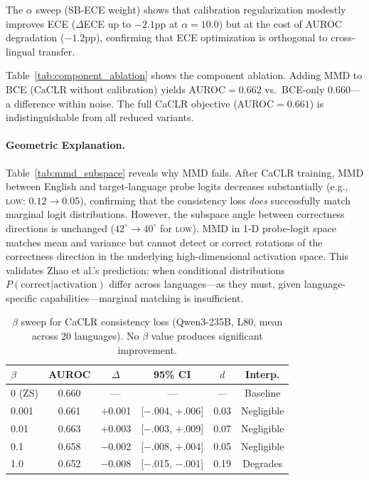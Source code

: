 \documentclass[11pt,a4paper]{article}
\newcommand{\auroc}{AUROC}
\begin{document}
The $\alpha$ sweep (SB-ECE weight) shows that calibration regularization modestly improves ECE ($\Delta$ECE up to $-2.1$pp at $\alpha=10.0$) but at the cost of \auroc{} degradation ($-1.2$pp), confirming that ECE optimization is orthogonal to cross-lingual transfer.

Table~\ref{tab:component_ablation} shows the component ablation. Adding MMD to BCE (CaCLR without calibration) yields \auroc{}$=0.662$ vs.\ BCE-only $0.660$---a difference within noise. The full CaCLR objective (\auroc{}$=0.661$) is indistinguishable from all reduced variants.

\paragraph{Geometric Explanation.}
Table~\ref{tab:mmd_subspace} reveals why MMD fails. After CaCLR training, MMD between English and target-language probe logits decreases substantially (e.g., \textsc{low}: $0.12 \to 0.05$), confirming that the consistency loss \emph{does} successfully match marginal logit distributions. However, the subspace angle between correctness directions is unchanged ($42^\circ \to 40^\circ$ for \textsc{low}). MMD in 1-D probe-logit space matches mean and variance but cannot detect or correct rotations of the correctness direction in the underlying high-dimensional activation space. This validates Zhao et al.'s \citeyearpar{zhao2019learning} prediction: when conditional distributions $P(\text{correct}|\text{activation})$ differ across languages---as they must, given language-specific capabilities---marginal matching is insufficient.

\begin{table}[t]
\centering
\small
\begin{tabular}{lccccc}
\toprule
$\beta$ & \auroc{} & $\Delta$ & 95\% CI & $d$ & Interp. \\
\midrule
0 (ZS) & 0.660 & --- & --- & --- & Baseline \\
0.001 & 0.661 & $+$0.001 & [$-$.004, $+$.006] & 0.03 & Negligible \\
0.01  & 0.663 & $+$0.003 & [$-$.003, $+$.009] & 0.07 & Negligible \\
0.1   & 0.658 & $-$0.002 & [$-$.008, $+$.004] & 0.05 & Negligible \\
1.0   & 0.652 & $-$0.008 & [$-$.015, $-$.001] & 0.19 & Degrades \\
\bottomrule
\end{tabular}
\caption{$\beta$ sweep for CaCLR consistency loss (Qwen3-235B, L80, mean across 20 languages). No $\beta$ value produces significant improvement.}
\label{tab:beta_sweep}
\end{table}
\end{document}
